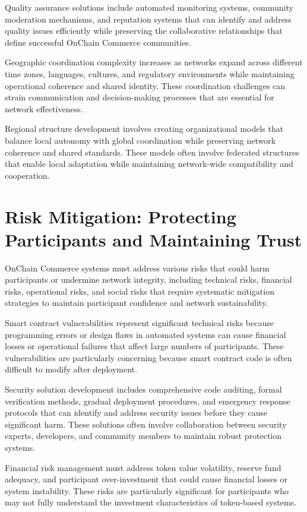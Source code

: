 \documentclass[
  Letterpaper,
]{scrbook}
\begin{document}
Quality assurance solutions include automated monitoring systems,
community moderation mechanisms, and reputation systems that can
identify and address quality issues efficiently while preserving the
collaborative relationships that define successful OnChain Commerce
communities.

Geographic coordination complexity increases as networks expand across
different time zones, languages, cultures, and regulatory environments
while maintaining operational coherence and shared identity. These
coordination challenges can strain communication and decision-making
processes that are essential for network effectiveness.

Regional structure development involves creating organizational models
that balance local autonomy with global coordination while preserving
network coherence and shared standards. These models often involve
federated structures that enable local adaptation while maintaining
network-wide compatibility and cooperation.

\section{Risk Mitigation: Protecting Participants and Maintaining
Trust}\label{risk-mitigation-protecting-participants-and-maintaining-trust}

OnChain Commerce systems must address various risks that could harm
participants or undermine network integrity, including technical risks,
financial risks, operational risks, and social risks that require
systematic mitigation strategies to maintain participant confidence and
network sustainability.

Smart contract vulnerabilities represent significant technical risks
because programming errors or design flaws in automated systems can
cause financial losses or operational failures that affect large numbers
of participants. These vulnerabilities are particularly concerning
because smart contract code is often difficult to modify after
deployment.

Security solution development includes comprehensive code auditing,
formal verification methods, gradual deployment procedures, and
emergency response protocols that can identify and address security
issues before they cause significant harm. These solutions often involve
collaboration between security experts, developers, and community
members to maintain robust protection systems.

Financial risk management must address token value volatility, reserve
fund adequacy, and participant over-investment that could cause
financial losses or system instability. These risks are particularly
significant for participants who may not fully understand the investment
characteristics of token-based systems.
\end{document}
